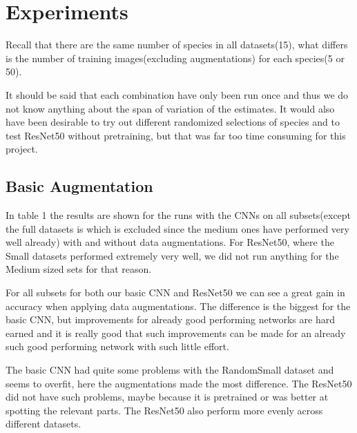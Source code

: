 \documentclass{article}
\begin{document}
\section{Experiments}

% 

Recall that there are the same number of species in all datasets(15), what differs is the number of training images(excluding augmentations) for each species(5 or 50).

It should be said that each combination have only been run once and thus we do not know anything about the span of variation of the estimates. It would also have been desirable to try out different randomized selections of species and to test ResNet50 without pretraining, but that was far too time consuming for this project.

\subsection{Basic Augmentation}
In table 1 the results are shown for the runs with the CNNs on all subsets(except the full datasets is which is excluded since the medium ones have performed very well already) with and without data augmentations. For ResNet50, where the Small datasets performed extremely very well, we did not run anything for the Medium sized sets for that reason. 

For all subsets for both our basic CNN and ResNet50 we can see a great gain in accuracy when applying data augmentations. The difference is the biggest for the basic CNN, but improvements for already good performing networks are hard earned and it is really good that such improvements can be made for an already such good performing network with such little effort. 

The basic CNN had quite some problems with the RandomSmall dataset and seems to overfit, here the augmentations made the most difference. The ResNet50 did not have such problems, maybe because it is pretrained or was better at spotting the relevant parts. The ResNet50 also perform more evenly across different datasets. 
\end{document}
